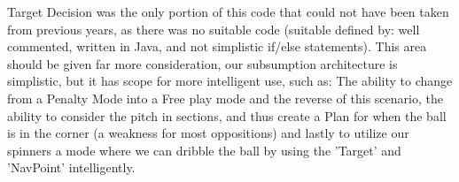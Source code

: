 Target Decision was the only portion of this code that could not have been 
taken from previous years, as there was no suitable code (suitable defined by:
well commented, written in Java, and not simplistic if/else statements). This 
area should be given far more consideration, our subsumption architecture is
simplistic, but it has scope for more intelligent use, such as: The ability to
change from a Penalty Mode into a Free play mode and the reverse of this 
scenario, the ability to consider the pitch in sections, and thus create a Plan
for when the ball is in the corner (a weakness for most oppositions) and lastly 
to utilize our spinners a mode where we can dribble the ball by using the 
'Target' and 'NavPoint' intelligently.


